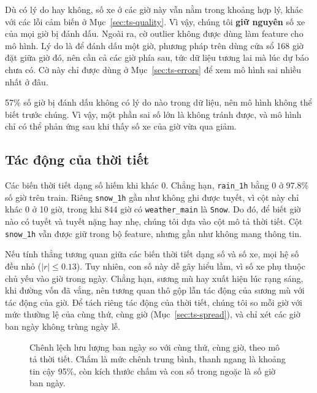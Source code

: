 Dù có lý do hay không, số xe ở các giờ này vẫn nằm trong khoảng hợp lý, khác với các lỗi cảm biến ở Mục~\ref{sec:ts-quality}. Vì vậy,
chúng tôi \textbf{giữ nguyên} số xe của mọi giờ bị đánh dấu. Ngoài ra, cờ outlier không được dùng làm feature cho mô hình. Lý do là để đánh
dấu một giờ, phương pháp trên dùng cửa sổ 168 giờ đặt giữa giờ đó, nên cần cả các giờ phía sau, tức dữ liệu tương lai mà lúc dự báo chưa
có. Cờ này chỉ được dùng ở Mục~\ref{sec:ts-errors} để xem mô hình sai nhiều nhất ở đâu.

\begin{tsinsight}
57\% số giờ bị đánh dấu không có lý do nào trong dữ liệu, nên mô hình không thể biết trước chúng. Vì vậy, một phần sai số lớn là không tránh
được, và mô hình chỉ có thể phản ứng sau khi thấy số xe của giờ vừa qua giảm.
\end{tsinsight}

\subsection{Tác động của thời tiết}
\label{sec:ts-weather}
\label{sec:ts-inputs}
Các biến thời tiết dạng số hiếm khi khác 0. Chẳng hạn, \texttt{rain\_1h} bằng 0 ở 97.8\% số giờ trên train. Riêng \texttt{snow\_1h} gần như
không ghi được tuyết, vì cột này chỉ khác 0 ở 10 giờ, trong khi 844 giờ có \texttt{weather\_main} là \texttt{Snow}. Do đó, để biết giờ nào có tuyết và tuyết nặng
hay nhẹ, chúng tôi dựa vào cột mô tả thời tiết. Cột \texttt{snow\_1h} vẫn được giữ trong bộ feature, nhưng gần như không mang thông tin.

Nếu tính thẳng tương quan giữa các biến thời tiết dạng số và số xe, mọi hệ số đều nhỏ ($|r| \le 0.13$). Tuy nhiên, con số này dễ gây hiểu
lầm, vì số xe phụ thuộc chủ yếu vào giờ trong ngày. Chẳng hạn, sương mù hay xuất hiện lúc rạng sáng, khi đường vốn đã vắng, nên tương quan
thô gộp lẫn tác động của sương mù với tác động của giờ. Để tách riêng tác động của thời tiết, chúng tôi so mỗi giờ với mức thường lệ của cùng
thứ, cùng giờ (Mục~\ref{sec:ts-spread}), và chỉ xét các giờ ban ngày không trùng ngày lễ.

\begin{figure}[H]
\centering
{}
\caption{Chênh lệch lưu lượng ban ngày so với cùng thứ, cùng giờ, theo mô tả thời tiết. Chấm là mức chênh trung bình, thanh ngang là
khoảng tin cậy 95\%, còn kích thước chấm và con số trong ngoặc là số giờ ban ngày.}
\label{fig:ts-weather}
\end{figure}

